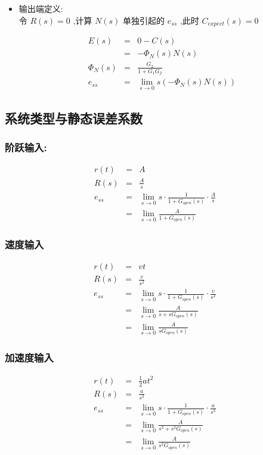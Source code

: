 \documentclass{article}
\begin{document}
\begin{frame}
\begin{itemize}
\item 输出端定义:\\
\label{sec-3-1-4-2}%
令 $R(s)=0$ ,计算 $N(s)$ 单独引起的 $e_{ss}$ ,此时 $C_{expect}(s)=0$ 

\begin{eqnarray*}
E(s) & = & 0-C(s) \\
     & = & -\Phi_N(s)N(s)\\
\Phi_N(s) &=& \frac{G_2}{1+G_1G_2}\\
e_{ss}&=&\lim_{s\rightarrow 0}s(-\Phi_N(s)N(s)) 
\end{eqnarray*}

\end{itemize} %
\end{frame}
\subsection{系统类型与静态误差系数}
\label{sec-3-2}
\begin{frame}
\frametitle{阶跃输入:}
\label{sec-3-2-1}

\begin{eqnarray*}
r(t) & = & A \\
R(s) & = & \frac{A}{s} \\
e_{ss}&=& \lim_{s\rightarrow 0}s \cdot\frac{1}{1+G_{open}(s)}\cdot\frac{A}{s} \\
      &=& \lim_{s\rightarrow 0}\frac{A}{1+G_{open}(s)}
\end{eqnarray*}
\end{frame}
\begin{frame}
\frametitle{速度输入}
\label{sec-3-2-2}

\begin{eqnarray*}
r(t) & = & vt \\
R(s) & = & \frac{v}{s^{2}} \\
e_{ss}&=& \lim_{s\rightarrow 0}s \cdot\frac{1}{1+G_{open}(s)}\cdot\frac{v}{s^{2}} \\
      &=& \lim_{s\rightarrow 0}\frac{A}{s+sG_{open}(s)}\\
      &=& \lim_{s\rightarrow 0}\frac{A}{sG_{open}(s)}
\end{eqnarray*}
\end{frame}
\begin{frame}
\frametitle{加速度输入}
\label{sec-3-2-3}

\begin{eqnarray*}
r(t) & = & \frac{1}{2}at^{2} \\
R(s) & = & \frac{a}{s^{2}} \\
e_{ss}&=& \lim_{s\rightarrow 0}s \cdot\frac{1}{1+G_{open}(s)}\cdot\frac{a}{s^{3}} \\
      &=& \lim_{s\rightarrow 0}\frac{A}{s^{2}+s^{2}G_{open}(s)}\\
      &=& \lim_{s\rightarrow 0}\frac{A}{s^{2}G_{open}(s)}
\end{eqnarray*}
\end{frame}
\end{document}
